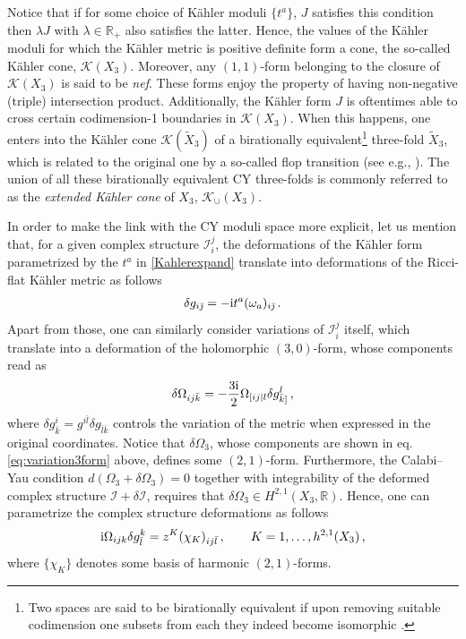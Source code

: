 %
Notice that if for some choice of K\"ahler moduli $\{ t^a\}$, $J$ satisfies this condition then $\lambda J$ with $\lambda\in\mathbb{R}_+$ also satisfies the latter. Hence, the values of the K\"ahler moduli for which the K\"ahler metric is positive definite form a cone, the so-called K\"ahler cone, $\mathcal{K}(X_3)$. Moreover, any $(1,1)$-form belonging to the closure of $\mathcal{K}(X_3)$ is said to be \emph{nef}. These forms enjoy the property of having non-negative (triple) intersection product. Additionally, the K\"ahler form $J$ is oftentimes able to cross certain codimension-1 boundaries in $\mathcal{K}(X_3)$. When this happens, one enters into the K\"ahler cone $\mathcal{K}(\tilde{X}_3)$ of a birationally equivalent\footnote{Two spaces are said to be birationally equivalent if upon removing suitable codimension one subsets from each they indeed become isomorphic \cite{Aspinwall:1993xz}.} three-fold $\tilde{X}_3$, which is related to the original one by a so-called flop transition (see e.g., \cite{Greene:1996cy}). The union of all these birationally equivalent CY three-folds is commonly referred to as the \emph{extended K\"ahler cone} of $X_3$, $\mathcal{K}_{\cup}(X_3)$.

In order to make the link with the CY moduli space more explicit, let us mention that, for a given complex structure $\mathcal{I}^j_i$, the deformations of the K\"ahler form parametrized by the $t^a$ in \eqref{Kahlerexpand} translate into deformations of the Ricci-flat K\"ahler metric as follows
%
\begin{align}\label{Kahlerdeform}
 \delta g_{i\bar \jmath} = -\text{i} t^a (\omega_a)_{i\bar \jmath}\, . 
\end{align}
%
Apart from those, one can similarly consider variations of $\mathcal{I}^j_i$ itself, which translate into a deformation of the holomorphic $(3,0)$-form, whose components read as \cite{Koerber:2010bx}
%
\begin{align}\label{eq:variation3form}
   \delta\Omega_{ij \bar{k}}= -\frac{3\text{i}}{2} \Omega_{[ij|l}\delta g^l_{\bar{k}]}\, ,
 \end{align}
%
where $\delta  g^i_{\bar{k}}= g^{i \bar{l}} \delta  g_{\bar{l} \bar{k}}$ controls the variation of the metric when expressed in the original coordinates. Notice that $\delta \Omega_3$, whose components are shown in eq. \eqref{eq:variation3form} above, defines some $(2,1)$-form. Furthermore, the Calabi--Yau condition $d\left(\Omega_3 + \delta \Omega_3\right)=0$ together with integrability of the deformed complex structure $\mathcal{I} + \delta \mathcal{I}$, requires that $\delta \Omega_3 \in H^{2,1}(X_3, \mathbb{R})$. Hence, one can parametrize the complex structure deformations as follows
%
\begin{align}\label{complexstructuredef}
 \text{i} \Omega_{ijk}\delta g^k_{\bar l} = z^K (\chi_{K})_{ij\bar l}\, , \qquad K= 1, \ldots, h^{2,1} (X_3)\, ,
\end{align}
%
where $\{\chi_{K}\}$ denotes some basis of harmonic $(2,1)$-forms.

